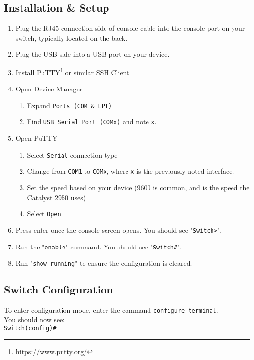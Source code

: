 \documentclass{ol-softwaremanual}
\newcommand{\doclink}[2]{\href{#1}{#2}\footnote{\url{#1}}}
\begin{document}
        \subsection{Installation \& Setup}\label{subsec:installation}
        \begin{enumerate}
            \item Plug the RJ45 connection side of console cable into the console port on your switch, typically located on the back.
            \item Plug the USB side into a USB port on your device.
            \item Install \doclink{https://www.putty.org/}{PuTTY} or similar SSH Client
            \item Open Device Manager
                \begin{enumerate}
                    \item Expand \verb|Ports (COM & LPT)|
                    \item Find \verb|USB Serial Port (COMx)| and note \verb|x|.
                \end{enumerate}
            \item Open PuTTY
                \begin{enumerate}
                    \item Select \verb|Serial| connection type
                    \item Change from \verb|COM1| to \verb|COMx|, where \verb|x| is the previously noted interface.
                    \item Set the speed based on your device (9600 is common, and is the speed the Catalyst 2950 uses)
                    \item Select \verb|Open|
                \end{enumerate}
            \item Press enter once the console screen opens.
            You should see "\verb|Switch>|".
            \item Run the "\verb|enable|" command.
            You should see "\verb|Switch#|".
            \item Run "\verb|show running|" to ensure the configuration is cleared.
        \end{enumerate}
        \subsection{Switch Configuration}\label{subsec:config}
        To enter configuration mode, enter the command \verb|configure terminal|.\\
        You should now see:\\
        \verb|Switch(config)#|
\end{document}
